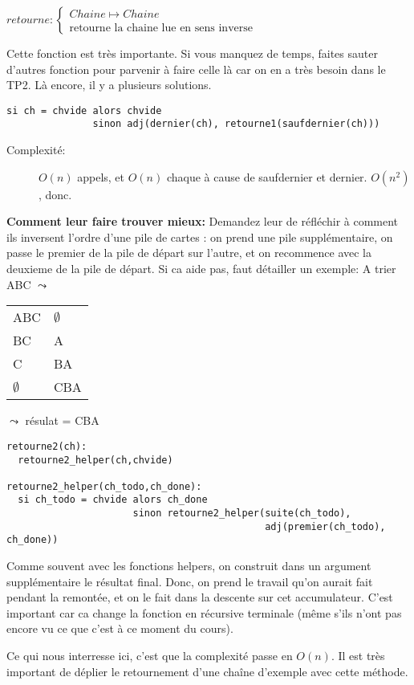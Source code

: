 \documentclass[10pt]{article}\usepackage[correction,nu]{esial}
\begin{document}
\begin{Question}
  $retourne: \left\{
    \begin{array}{l}
      Chaine\mapsto Chaine\\
      \text{retourne la chaine lue en sens inverse}
    \end{array}\right.$  
\end{Question}
\begin{Reponse}
  Cette fonction est très importante. Si vous manquez de temps, faites sauter
  d'autres fonction pour parvenir à faire celle là car on en a très besoin dans
  le TP2. Là encore, il y a plusieurs solutions.
  \begin{Verbatim}[label=retourne(ch) -- version bourinne]
si ch = chvide alors chvide
               sinon adj(dernier(ch), retourne1(saufdernier(ch)))
  \end{Verbatim}
  \begin{description}
  \item[Complexité:] $O(n)$ appels, et $O(n)$ chaque à cause de saufdernier et
    dernier. $O(n^2)$, donc.
  \end{description}
  
  \textbf{Comment leur faire trouver mieux:} Demandez leur de réfléchir à
  comment ils inversent l'ordre d'une pile de cartes : on prend une pile
  supplémentaire, on passe le premier de la pile de départ sur l'autre, et on
  recommence avec la deuxieme de la pile de départ. Si ca aide pas, faut
  détailler un exemple:
  A trier ABC $\leadsto$ \begin{tabular}{|l l|}\hline
    ABC&$\emptyset$\\
    BC&A\\
    C&BA\\
    $\emptyset$&CBA\\\hline
  \end{tabular}$\leadsto$ résulat = CBA

  \begin{Verbatim}[label=retourne(ch) -- avec helper]
retourne2(ch):
  retourne2_helper(ch,chvide)

retourne2_helper(ch_todo,ch_done):
  si ch_todo = chvide alors ch_done
                      sinon retourne2_helper(suite(ch_todo),
                                             adj(premier(ch_todo), ch_done))
  \end{Verbatim}
  Comme souvent avec les fonctions helpers, on construit dans un argument
  supplémentaire le résultat final. Donc, on prend le travail qu'on aurait fait
  pendant la remontée, et on le fait dans la descente sur cet
  accumulateur. C'est important car ca change la fonction en récursive
  terminale (même s'ils n'ont pas encore vu ce que c'est à ce moment du cours).

  Ce qui nous interresse ici, c'est que la complexité passe en $O(n)$. Il est
  très important de déplier le retournement d'une chaîne d'exemple avec cette
  méthode. 

\end{Reponse}
\end{document}
